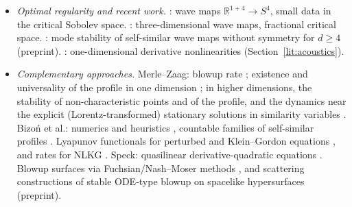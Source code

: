 \begin{itemize}[leftmargin=1.2em,itemsep=1pt]
$S^3$ wave map. \cite{ChenEtAl2024}: quadratic equation, $d=7$, conditional
codimension-one stability up to near the Cauchy horizon.
\cite{DonningerOstermann2023}: global stability of the Yang--Mills profile,
odd $d$. \cite{Glogic2023}: global-in-space stability for Yang--Mills in
higher dimensions (preprint). \cite{Glogic2025}:
globally stable wave-map profile in all $d\ge3$. \cite{DonningerOstermann2024}:
wave maps and Yang--Mills in regions approaching the future light cone of
the singularity (preprint).
\item \emph{Optimal regularity and recent work.} \cite{DonningerWallauch2023}:
wave maps $\mathbb{R}^{1+4}\to S^4$, small data in the critical Sobolev
space. \cite{DonningerWallauch2025}: three-dimensional wave maps, fractional
critical space. \cite{DonningerMoscatelli2026a}: mode stability of
self-similar wave maps without symmetry for $d\ge4$ (preprint).
\cite{Gough2025,LiuRaees2025,GhoulLiuMasmoudi2025}: one-dimensional
derivative nonlinearities (Section~\ref{lit:acoustics}).
\item \emph{Complementary approaches.} Merle--Zaag: blowup rate
\cite{MerleZaag2003}; existence and universality of the profile in one
dimension \cite{MerleZaag2007}; in higher dimensions, the stability of
non-characteristic points and of the profile, and the dynamics near the
explicit (Lorentz-transformed) stationary solutions in similarity variables
\cite{MerleZaag2015,MerleZaag2016}. Bizo\'n et al.: numerics and heuristics
\cite{BizonChmajTabor2004}, countable families of self-similar profiles
\cite{BizonMaisonWasserman2007}. Lyapunov functionals for perturbed and
Klein--Gordon equations \cite{HamzaZaag2010,HamzaZaag2012,HamzaZaag2013},
and rates for NLKG \cite{KillipStovallVisan2014}. Speck: quasilinear
derivative-quadratic equations \cite{Speck2020}. Blowup surfaces via
Fuchsian/Nash--Moser methods \cite{Kichenassamy1996}, and scattering
constructions of stable ODE-type blowup on spacelike hypersurfaces
\cite{KadarLi2026} (preprint).
\end{itemize}

